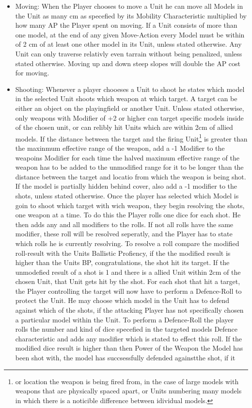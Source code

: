 \documentclass[a4paper,14pt]{book}
\begin{document}
\begin{adjustwidth}{-3cm}{-3cm}
\begin{multicols}{2}
\begin{itemize}

	\item Moving: When the Player chooses to move a Unit he can move all Models in the Unit as many cm as specefied by its Mobility Characteristic multiplied by how many AP the Player spent on moving. If a Unit consists of more than one model, at the end of any given Move-Action every Model must be within of 2 cm of at least one other model in its Unit, unless stated otherwise. Any Unit can only traverse relativly even tarrain without being penalized, unless stated otherwise. Moving up and down steep slopes will double the AP cost for moving.
	\item Shooting: Whenever a player chooeses a Unit to shoot he states which model in the selected Unit shoots which weapon at which target. A target can be either an object on the playingfield or another Unit. Unless stated otherwise, only weapons with Modifier of +2 or higher can target specific models inside of the chosen unit, or can relibly hit Units which are within 2cm of allied models. If the distance between the target and the firing Unit\footnote{or location the weapon is being fired from, in the case of large models with weapons that are physically spaced apart, or Units numbering many models in which there is a noticible difference between idividual models.} is greater than the maxinmum effective range of the weapon, add a -1 Modifier to the weapoins Modifier for each time the halved maximum effective range of the weapon has to be added to the unmodified range for it to be longer than the distance between the target and locatio from which the weapon is being shot. If the model is partially hidden behind cover, also add a -1 modifier to the shots, unless stated otherwise. Once the player has selected which Model is goin to shoot which target with wich weapon, they begin resolving the shots, one weapon at a time. To do this the Player rolls one dice for each shot. He then adds any and all modifiers to the rolls. If not all rolls have the same modifier, these roll will be resolved seperatly, and the Player has to state which rolls he is currently resolving. To resolve a roll compare the modified roll-result with the Units Ballistic Profiency, if the the modified result is higher than the Units BP, congratulations, the shot hit its target. If the unmodefied result of a shot is 1 and there is a allied Unit within 2cm of the chosen Unit, that Unit gets hit by the shot. For each shot that hit a target, the Player controlling the target will now have to perform a Defence-Roll to protect the Unit. He may choose which model in the Unit has to defend against which of the shots, if the attacking Player has not specifically chosen a particular model within the Unit. To perform a Defence-Roll the player rolls the number and kind of dice specefied in the targeted models Defence characteristic and adds any modifier which is stated to effect this roll. If the modified dice result is higher than then Power of the Weapon the Model has been shot with, the model has succsessfully defended againstthe  shot, if it 
\end{itemize}
\end{multicols}
\end{adjustwidth}
\end{document}
